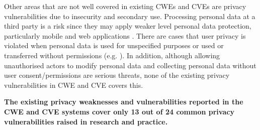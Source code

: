 Other areas that are not well covered in existing CWEs and CVEs are privacy vulnerabilities due to insecurity and secondary use. Processing personal data at a third party is a risk since they may apply weaker level personal data protection, particularly mobile \cite{Zhang2020a} and web applications \cite{OWASPsurvey}. There are cases that user privacy is violated when personal data is used for unspecified purposes or used or transferred without permissions (e.g. \cite{Hasan2020, De2016, Fisk2015, HIPAA, GLBA, US1974}). In addition, although allowing unauthorised actors to modify personal data and collecting personal data without user consent/permissions are serious threats, none of the existing privacy vulnerabilities in CWE and CVE covers this.

\begin{conclusion}
	\textbf{The existing privacy weaknesses and vulnerabilities reported in the CWE and CVE systems cover only 13 out of 24 common privacy vulnerabilities raised in research and practice.}
\end{conclusion} 